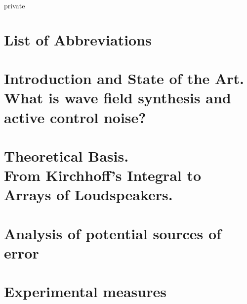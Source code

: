 \documentclass[11pt,a4paper,notitlepage]{report}
\providecommand\phantomsection{}
\newcommand{\TexFolder}{Tex/}
\begin{document}
\phantomsection
\listoffigures

\newpage

\begin{shownto}{private}
\phantomsection
{}
\chapter*{List of Abbreviations}

\end{shownto}

\newpage
\setcounter{page}{1}

\chapter[Introduction and State of the Art]{Introduction and State of the Art.\\What is wave field synthesis and active control noise?}


\chapter[Theoretical Basis]{Theoretical Basis.\\From Kirchhoff's Integral to Arrays of Loudspeakers.}\label{chapterWFStheory}

%
%

%

\chapter{Analysis of potential sources of error}
%


\chapter{Experimental measures}

\end{document}
